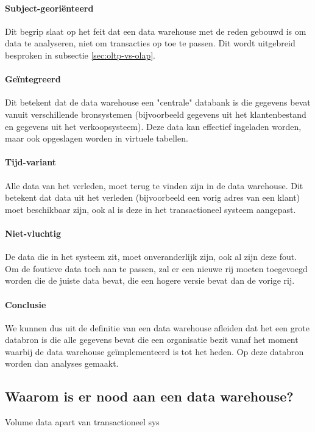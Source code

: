 \paragraph{Subject-georiënteerd}
Dit begrip slaat op het feit dat een data warehouse met de reden gebouwd is om data te analyseren, niet om transacties op toe te passen. Dit wordt uitgebreid besproken in subsectie \ref{sec:oltp-vs-olap}.


\paragraph{Geïntegreerd}
Dit betekent dat de data warehouse een "centrale" databank is die gegevens bevat vanuit verschillende bronsystemen (bijvoorbeeld gegevens uit het klantenbestand en gegevens uit het verkoopsysteem). Deze data kan effectief ingeladen worden, maar ook opgeslagen worden in virtuele tabellen.

\paragraph{Tijd-variant}
Alle data van het verleden, moet terug te vinden zijn in de data warehouse. Dit betekent dat data uit het verleden (bijvoorbeeld een vorig adres van een klant) moet beschikbaar zijn, ook al is deze in het transactioneel systeem aangepast.

\paragraph{Niet-vluchtig}
De data die in het systeem zit, moet onveranderlijk zijn, ook al zijn deze fout. Om de foutieve data toch aan te passen, zal er een nieuwe rij moeten toegevoegd worden die de juiste data bevat, die een hogere versie bevat dan de vorige rij. 

\paragraph{Conclusie}
We kunnen dus uit de definitie van een data warehouse afleiden dat het een grote databron is die alle gegevens bevat die een organisatie bezit vanaf het moment waarbij de data warehouse geïmplementeerd is tot het heden. Op deze databron worden dan analyses gemaakt.

\subsection{Waarom is er nood aan een data warehouse?}
Volume data
apart van transactioneel sys

